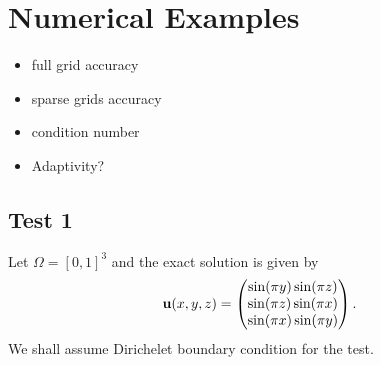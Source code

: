 \documentclass[final,leqno]{siamltex704}
\def\bu{{\bf u}}
\begin{document}

\section{Numerical Examples}
\begin{itemize}
\item full grid accuracy
\item sparse grids accuracy
\item condition number
\item Adaptivity?
\end{itemize}
\subsection{Test 1}
Let $\Omega=[0,1]^3$ and the exact solution is given by
\begin{eqnarray}
\bu(x,y,z)=\begin{pmatrix}
\sin(\pi y)\sin(\pi z)\\
\sin(\pi z)\sin(\pi x)\\
\sin(\pi x)\sin(\pi y)
\end{pmatrix}.
\end{eqnarray}
We shall assume Dirichelet boundary condition for the test.
\end{document}
